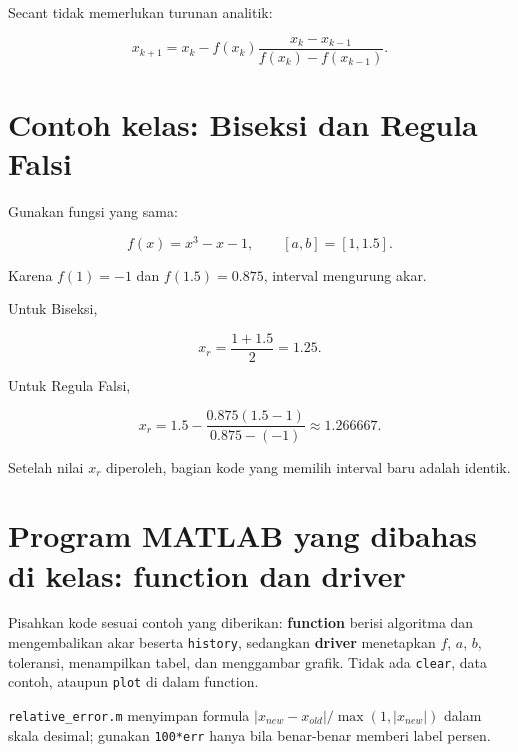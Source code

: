 Secant tidak memerlukan turunan analitik:

\begin{equation}
x_{k+1}
=
x_k-
f(x_k)
\frac{x_k-x_{k-1}}
{f(x_k)-f(x_{k-1})}.
\end{equation}

\section{Contoh kelas: Biseksi dan Regula Falsi}

Gunakan fungsi yang sama:

\begin{equation}
f(x)=x^3-x-1,
\qquad [a,b]=[1,1.5].
\end{equation}

Karena $f(1)=-1$ dan $f(1.5)=0.875$, interval mengurung akar.

Untuk Biseksi,

\begin{equation}
x_r=\frac{1+1.5}{2}=1.25.
\end{equation}

Untuk Regula Falsi,

\begin{equation}
x_r
=
1.5-\frac{0.875(1.5-1)}{0.875-(-1)}
\approx1.266667.
\end{equation}

Setelah nilai $x_r$ diperoleh, bagian kode yang memilih interval baru adalah identik.

\section{Program MATLAB yang dibahas di kelas: function dan driver}
Pisahkan kode sesuai contoh yang diberikan: \textbf{function} berisi algoritma dan mengembalikan akar beserta \texttt{history}, sedangkan \textbf{driver} menetapkan $f$, $a$, $b$, toleransi, menampilkan tabel, dan menggambar grafik. Tidak ada \texttt{clear}, data contoh, ataupun \texttt{plot} di dalam function.

\texttt{relative\_error.m} menyimpan formula $|x_{new}-x_{old}|/\max(1,|x_{new}|)$ dalam skala desimal; gunakan \texttt{100*err} hanya bila benar-benar memberi label persen.





